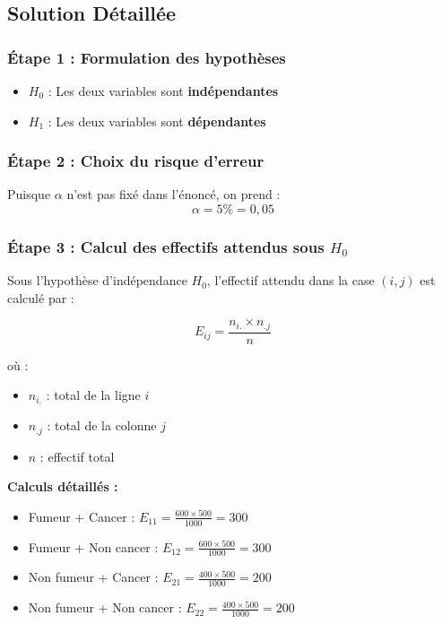 \documentclass[11pt,a4paper]{article}
\begin{document}
\subsection{Solution Détaillée}

\subsubsection{Étape 1 : Formulation des hypothèses}

\begin{itemize}
    \item \textbf{$H_0$} : Les deux variables sont \textbf{indépendantes}
    \item \textbf{$H_1$} : Les deux variables sont \textbf{dépendantes}
\end{itemize}

\subsubsection{Étape 2 : Choix du risque d'erreur}

Puisque $\alpha$ n'est pas fixé dans l'énoncé, on prend :
$$\alpha = 5\% = 0,05$$

\subsubsection{Étape 3 : Calcul des effectifs attendus sous $H_0$}

Sous l'hypothèse d'indépendance $H_0$, l'effectif attendu dans la case $(i,j)$ est calculé par :

$$E_{ij} = \frac{n_{i.} \times n_{.j}}{n}$$

où :
\begin{itemize}
    \item $n_{i.}$ : total de la ligne $i$
    \item $n_{.j}$ : total de la colonne $j$
    \item $n$ : effectif total
\end{itemize}

\textbf{Calculs détaillés :}

\begin{itemize}
    \item Fumeur + Cancer : $E_{11} = \frac{600 \times 500}{1000} = 300$
    \item Fumeur + Non cancer : $E_{12} = \frac{600 \times 500}{1000} = 300$
    \item Non fumeur + Cancer : $E_{21} = \frac{400 \times 500}{1000} = 200$
    \item Non fumeur + Non cancer : $E_{22} = \frac{400 \times 500}{1000} = 200$
\end{itemize}
\end{document}
